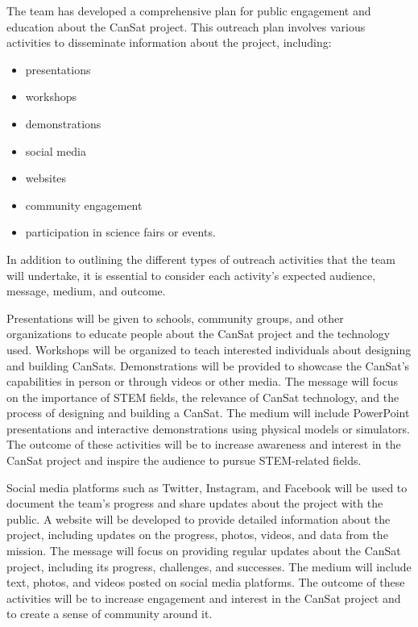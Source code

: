 \documentclass[11pt]{article}
\begin{document}
The team has developed a comprehensive plan for public engagement and education about the CanSat project. This outreach plan involves various activities to disseminate information about the project, including:
\begin{multicols}{2}[\vspace{-0.5\baselineskip}]
        \begin{itemize}[leftmargin=1cm,itemindent=0.5cm,noitemsep, topsep=0pt, label=$\bullet$]
\item presentations
\item workshops
\item demonstrations
\item social media
\item websites
\item community engagement
\item participation in science fairs or events.
\end{itemize}
\end{multicols}
\vspace*{-0.5\baselineskip}

In addition to outlining the different types of outreach activities that the team will undertake, it is essential to consider each activity's expected audience, message, medium, and outcome.

Presentations will be given to schools, community groups, and other organizations to educate people about the CanSat project and the technology used. Workshops will be organized to teach interested individuals about designing and building CanSats. Demonstrations will be provided to showcase the CanSat's capabilities in person or through videos or other media. The message will focus on the importance of STEM fields, the relevance of CanSat technology, and the process of designing and building a CanSat. The medium will include PowerPoint presentations and interactive demonstrations using physical models or simulators. The outcome of these activities will be to increase awareness and interest in the CanSat project and inspire the audience to pursue STEM-related fields.

Social media platforms such as Twitter, Instagram, and Facebook will be used to document the team's progress and share updates about the project with the public. A website will be developed to provide detailed information about the project, including updates on the progress, photos, videos, and data from the mission. The message will focus on providing regular updates about the CanSat project, including its progress, challenges, and successes. The medium will include text, photos, and videos posted on social media platforms. The outcome of these activities will be to increase engagement and interest in the CanSat project and to create a sense of community around it.
\end{document}
